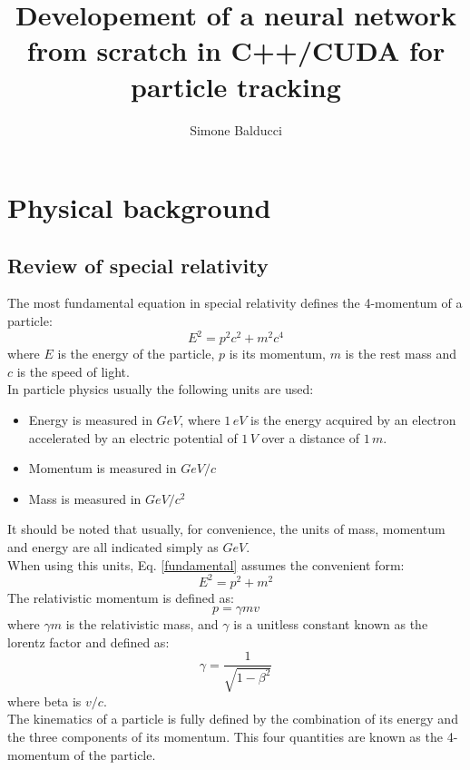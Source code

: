 \documentclass[12pt]{article}
\title{Developement of a neural network from scratch in C++/CUDA for particle tracking}
\author{Simone Balducci}
\date{}
\begin{document}
\maketitle

\section{Physical background}
\subsection{Review of special relativity}
The most fundamental equation in special relativity defines the 4-momentum of a particle:
\begin{equation}
  E^2 = p^2c^2 + m^2c^4
\label{fundamental}
\end{equation}
where $E$ is the energy of the particle, $p$ is its momentum, $m$ is the rest mass and $c$ is the speed of light. \\
In particle physics usually the following units are used:
\begin{itemize}
  \item Energy is measured in $GeV$, where $1\,eV$ is the energy acquired by an electron accelerated by an
	electric potential of $1\,V$ over a distance of $1\,m$.
  \item Momentum is measured in $GeV/c$
  \item Mass is measured in $GeV/c^2$
\end{itemize}
It should be noted that usually, for convenience, the units of mass, momentum and energy are all indicated 
simply as $GeV$. \\
When using this units, Eq. \ref{fundamental} assumes the convenient form:
\begin{equation}
  E^2 = p^2 + m^2
  \label{fundamental_conv}
\end{equation}
The relativistic momentum is defined as:
\begin{equation}
  p = \gamma m v
\end{equation}
where $\gamma m$ is the relativistic mass, and $\gamma$ is a unitless constant known as the lorentz factor
and defined as:
\begin{equation}
  \gamma = \frac{1}{\sqrt{1 - \beta^2}}
\end{equation}
where beta is $v/c$. \\
The kinematics of a particle is fully defined by the combination of its energy and the three components
of its momentum. This four quantities are known as the 4-momentum of the particle. \\ \\
\end{document}
